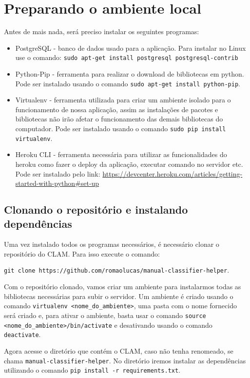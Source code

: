 \section{Preparando o ambiente local}

Antes de mais nada, será preciso instalar os seguintes programas:

\begin{itemize}
	\item PostgreSQL - banco de dados usado para a aplicação. Para instalar no Linux
	use o comando: \texttt{sudo apt-get install postgresql postgresql-contrib}
	\item Python-Pip - ferramenta para realizar o download de bibliotecas em python.
	Pode ser instalado usando o comando \texttt{sudo apt-get install python-pip}.
	\item Virtualenv - ferramenta utilizada para criar um ambiente isolado para
	o funcionamento de nossa aplicação, assim as instalações de pacotes e bibliotecas
	não irão afetar o funcionamento das demais bibliotecas do computador. Pode ser
	instalado usando o comando \texttt{sudo pip install virtualenv}.
	\item Heroku CLI - ferramenta necessária para utilizar as funcionalidades do heroku
	como fazer o deploy da aplicação, executar comando no servidor etc. Pode ser instalado
	pelo link: \url{https://devcenter.heroku.com/articles/getting-started-with-python\#set-up}
\end{itemize}

\subsection{Clonando o repositório e instalando dependências}

Uma vez instalado todos os programas necessários, é necessário clonar o repositório do CLAM.
Para isso execute o comando: 

\texttt{git clone https://github.com/romaolucas/manual-classifier-helper}.

Com o repositório clonado, vamos criar um ambiente para instalarmos todas as bibliotecas necessárias
para subir o servidor. Um ambiente é criado usando o comando \texttt{virtualenv <nome_do_ambiente>}, 
uma pasta com o nome fornecido será criado e, para ativar o ambiente, basta usar o comando 
\texttt{source <nome_do_ambiente>/bin/activate} e desativando usando o comando \texttt{deactivate}.

Agora acesse o diretório que contém o CLAM, caso não tenha renomeado, se chama \texttt{manual-classifier-helper}.
No diretório iremos instalar as dependências utilizando o comando \texttt{pip install -r requirements.txt}.

